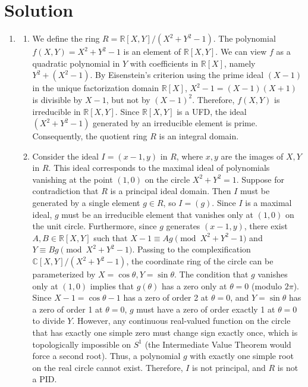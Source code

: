 \documentclass{article}
\begin{document}
\newpage
\section*{Solution}
\begin{enumerate}[label=\fbox{\arabic*}]
  \item %
        \begin{enumerate}[label=(\arabic*)]
          \item We define the ring $R = \mathbb{R}[X, Y]/(X^2 + Y^2 - 1)$. The polynomial $f(X, Y) = X^2 + Y^2 - 1$ is an element of $\mathbb{R}[X, Y]$. We can view $f$ as a quadratic polynomial in $Y$ with coefficients in $\mathbb{R}[X]$, namely $Y^2 + (X^2 - 1)$. By Eisenstein's criterion using the prime ideal $(X - 1)$ in the unique factorization domain $\mathbb{R}[X]$, $X^2 - 1 = (X - 1)(X + 1)$ is divisible by $X - 1$, but not by $(X - 1)^2$. Therefore, $f(X, Y)$ is irreducible in $\mathbb{R}[X, Y]$. Since $\mathbb{R}[X, Y]$ is a UFD, the ideal $(X^2 + Y^2 - 1)$ generated by an irreducible element is prime. Consequently, the quotient ring $R$ is an integral domain.
          \item Consider the ideal $I = (x - 1, y)$ in $R$, where $x, y$ are the images of $X, Y$ in $R$. This ideal corresponds to the maximal ideal of polynomials vanishing at the point $(1, 0)$ on the circle $X^2 + Y^2 = 1$. Suppose for contradiction that $R$ is a principal ideal domain. Then $I$ must be generated by a single element $g \in R$, so $I = (g)$. Since $I$ is a maximal ideal, $g$ must be an irreducible element that vanishes only at $(1, 0)$ on the unit circle. 
          Furthermore, since $g$ generates $(x - 1, y)$, there exist $A, B \in \mathbb{R}[X, Y]$ such that $X - 1 \equiv A g \pmod{X^2 + Y^2 - 1}$ and $Y \equiv B g \pmod{X^2 + Y^2 - 1}$. 
          Passing to the complexification $\mathbb{C}[X, Y]/(X^2 + Y^2 - 1)$, the coordinate ring of the circle can be parameterized by $X = \cos \theta, Y = \sin \theta$. The condition that $g$ vanishes only at $(1, 0)$ implies that $g(\theta)$ has a zero only at $\theta = 0$ (modulo $2\pi$). Since $X - 1 = \cos \theta - 1$ has a zero of order 2 at $\theta = 0$, and $Y = \sin \theta$ has a zero of order 1 at $\theta = 0$, $g$ must have a zero of order exactly 1 at $\theta = 0$ to divide $Y$. 
          However, any continuous real-valued function on the circle that has exactly one simple zero must change sign exactly once, which is topologically impossible on $S^1$ (the Intermediate Value Theorem would force a second root). Thus, a polynomial $g$ with exactly one simple root on the real circle cannot exist. Therefore, $I$ is not principal, and $R$ is not a PID.
        \end{enumerate}


\end{enumerate}
\end{document}
